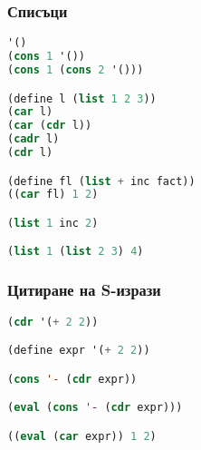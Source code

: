 \documentclass{beamer}
\begin{document}
\begin{frame}[fragile]
\frametitle{Списъци}

\begin{lstlisting}[basicstyle=\small,language=Lisp]
'()
(cons 1 '())
(cons 1 (cons 2 '()))

(define l (list 1 2 3))
(car l)
(car (cdr l))
(cadr l)
(cdr l)

(define fl (list + inc fact))
((car fl) 1 2)

(list 1 inc 2)

(list 1 (list 2 3) 4)

\end{lstlisting}

\end{frame}



\begin{frame}[fragile]
\frametitle{Цитиране на S-изрази}

\begin{lstlisting}[basicstyle=\small,language=Lisp]
(cdr '(+ 2 2))

(define expr '(+ 2 2))

(cons '- (cdr expr))

(eval (cons '- (cdr expr)))

((eval (car expr)) 1 2)
\end{lstlisting}

\end{frame}


\end{document}
